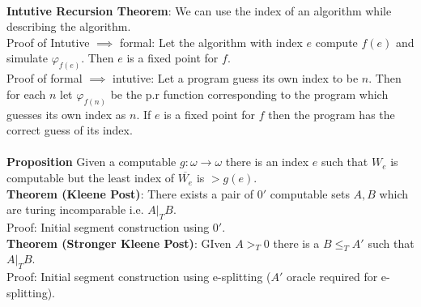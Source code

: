 \documentclass{article}
\begin{document}
   \\
   \textbf{Intutive Recursion Theorem}: We can use the index of an algorithm while describing the algorithm.
   \\ Proof of Intutive $\implies$ formal: Let the algorithm with index $e$ compute $f(e)$ and simulate $\varphi_{f(e)}$. Then $e$ is a fixed point for $f$.\\
   Proof of formal $\implies$ intutive: Let a program guess its own index to be $n$. Then for each $n$ let $\varphi_{f(n)}$ be the p.r function corresponding to the program which guesses its own index as $n$. If $e$ is a fixed point for $f$ then the program has the correct guess of its index.\\
   \\
   \textbf{Proposition} Given a computable $g: \omega \to \omega$ there is an index $e$ such that $W_e$ is computable but the least index of $\overline{W_e}$ is $> g(e)$.\\
   
   \textbf{Theorem (Kleene Post)}: There exists a pair of $0'$ computable sets $A,B$ which are turing incomparable i.e. $A |_T B$.\\
   Proof: Initial segment construction using $0'$.\\
   \textbf{Theorem (Stronger Kleene Post)}: GIven $A >_T 0$ there is a $B \leq_T A'$ such that $A |_T B$.\\
   Proof: Initial segment construction using e-splitting ($A'$ oracle required for e-splitting).
   \newpage
\end{document}
